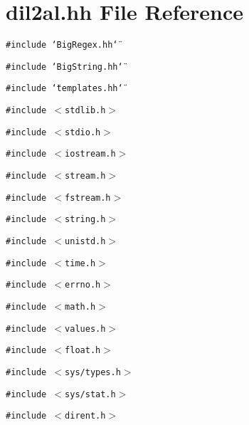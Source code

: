 \section{dil2al.hh File Reference}
\label{dil2al_8hh}
{\tt \#include \char`\"{}Big\-Regex.hh\char`\"{}}\par
{\tt \#include \char`\"{}Big\-String.hh\char`\"{}}\par
{\tt \#include \char`\"{}templates.hh\char`\"{}}\par
{\tt \#include $<$stdlib.h$>$}\par
{\tt \#include $<$stdio.h$>$}\par
{\tt \#include $<$iostream.h$>$}\par
{\tt \#include $<$stream.h$>$}\par
{\tt \#include $<$fstream.h$>$}\par
{\tt \#include $<$string.h$>$}\par
{\tt \#include $<$unistd.h$>$}\par
{\tt \#include $<$time.h$>$}\par
{\tt \#include $<$errno.h$>$}\par
{\tt \#include $<$math.h$>$}\par
{\tt \#include $<$values.h$>$}\par
{\tt \#include $<$float.h$>$}\par
{\tt \#include $<$sys/types.h$>$}\par
{\tt \#include $<$sys/stat.h$>$}\par
{\tt \#include $<$dirent.h$>$}\par
